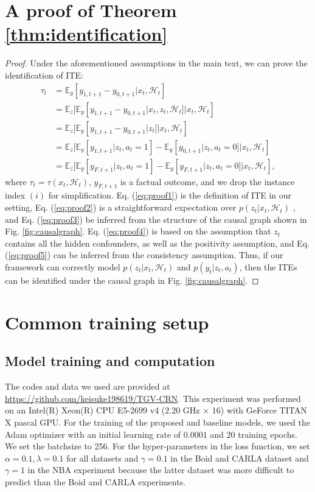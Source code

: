 \documentclass[journal]{IEEEtran}
\newcommand{\eq}[1]{\begin{align}#1\end{align}}
\begin{document}
\section{A proof of Theorem \ref{thm:identification}}
\label{app:proof}
\begin{proof}
Under the aforementioned assumptions in the main text, we can prove the identification of ITE:
\eq{\tau_t &= \mathbb{E}_y[ y_{1,t+1}-y_{0,t+1}|x_t,\mathcal{H}_t]\label{eq:proof1}\\
&=\mathbb{E}_z[\mathbb{E}_y[y_{1,t+1}-y_{0,t+1}|x_t,z_t,\mathcal{H}_t]|x_t,\mathcal{H}_t]\label{eq:proof2}\\
&=\mathbb{E}_z[\mathbb{E}_y[y_{1,t+1}-y_{0,t+1}|z_t]|x_t,\mathcal{H}_t]\label{eq:proof3}\\
&=\mathbb{E}_z[\mathbb{E}_y[y_{1,t+1}|z_t,a_t=1] - \mathbb{E}_y[y_{0,t+1}|z_t,a_t=0]|x_t,\mathcal{H}_t]\label{eq:proof4}\\
&=\mathbb{E}_z[\mathbb{E}_y[y_{F,t+1}|z_t,a_t=1] - \mathbb{E}_y[y_{F,t+1}|z_t,a_t=0]|x_t,\mathcal{H}_t],\label{eq:proof5}
}
where $\tau_t = \tau(x_t,\mathcal{H}_t)$, $y_{F,t+1}$ is a factual outcome, and we drop the instance index $(i)$ for simplification. 
Eq. (\ref{eq:proof1}) is the definition of ITE in our setting, Eq. (\ref{eq:proof2}) is a straightforward expectation over $p(z_t|x_t,\mathcal{H}_t)$ , and Eq. (\ref{eq:proof3}) be inferred from the structure of the causal graph shown in Fig. \ref{fig:causalgraph}.
Eq. (\ref{eq:proof4}) is based on the assumption that $z_t$ contains all the hidden confounders, as well as the positivity assumption, and Eq. (\ref{eq:proof5}) can be inferred from the consistency assumption. 
Thus, if our framework can correctly model $p(z_t|x_t,\mathcal{H}_t)$ and $p(y_t|z_t,a_t)$, then the ITEs can be identified under the causal graph in Fig. \ref{fig:causalgraph}.
\end{proof}

\section{Common training setup}
\label{app:common}
\subsection{Model training and computation}
\label{app:ourtraining}
The codes and data we used are provided at \url{https://github.com/keisuke198619/TGV-CRN}.
This experiment was performed on an Intel(R) Xeon(R) CPU E5-2699 v4 ($2.20$ GHz $\times$ 16) with GeForce TITAN X pascal GPU.
For the training of the proposed and baseline models, we used the Adam optimizer \cite{Kingma15} with an initial learning rate of $0.0001$ and $20$ training epochs.
We set the batchsize to 256.
For the hyper-parameters in the loss function, we set $\alpha = 0.1, \lambda = 0.1$ for all datasets and  $\gamma = 0.1$ in the Boid and CARLA dataset and  $\gamma = 1$ in the NBA experiment because the latter dataset was more difficult to predict than the Boid and CARLA experiments.
\end{document}
